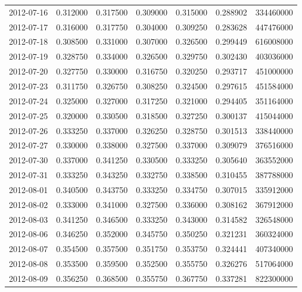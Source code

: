 \begin{tabular}{lrrrrrr}
2012-07-16 &    0.312000 &    0.317500 &    0.309000 &    0.315000 &    0.288902 &   334460000 \\
2012-07-17 &    0.316000 &    0.317750 &    0.304000 &    0.309250 &    0.283628 &   447476000 \\
2012-07-18 &    0.308500 &    0.331000 &    0.307000 &    0.326500 &    0.299449 &   616008000 \\
2012-07-19 &    0.328750 &    0.334000 &    0.326500 &    0.329750 &    0.302430 &   403036000 \\
2012-07-20 &    0.327750 &    0.330000 &    0.316750 &    0.320250 &    0.293717 &   451000000 \\
2012-07-23 &    0.311750 &    0.326750 &    0.308250 &    0.324500 &    0.297615 &   451584000 \\
2012-07-24 &    0.325000 &    0.327000 &    0.317250 &    0.321000 &    0.294405 &   351164000 \\
2012-07-25 &    0.320000 &    0.330500 &    0.318500 &    0.327250 &    0.300137 &   415044000 \\
2012-07-26 &    0.333250 &    0.337000 &    0.326250 &    0.328750 &    0.301513 &   338440000 \\
2012-07-27 &    0.330000 &    0.338000 &    0.327500 &    0.337000 &    0.309079 &   376516000 \\
2012-07-30 &    0.337000 &    0.341250 &    0.330500 &    0.333250 &    0.305640 &   363552000 \\
2012-07-31 &    0.333250 &    0.343250 &    0.332750 &    0.338500 &    0.310455 &   387788000 \\
2012-08-01 &    0.340500 &    0.343750 &    0.333250 &    0.334750 &    0.307015 &   335912000 \\
2012-08-02 &    0.333000 &    0.341000 &    0.327500 &    0.336000 &    0.308162 &   367912000 \\
2012-08-03 &    0.341250 &    0.346500 &    0.333250 &    0.343000 &    0.314582 &   326548000 \\
2012-08-06 &    0.346250 &    0.352000 &    0.345750 &    0.350250 &    0.321231 &   360324000 \\
2012-08-07 &    0.354500 &    0.357500 &    0.351750 &    0.353750 &    0.324441 &   407340000 \\
2012-08-08 &    0.353500 &    0.359500 &    0.352500 &    0.355750 &    0.326276 &   517064000 \\
2012-08-09 &    0.356250 &    0.368500 &    0.355750 &    0.367750 &    0.337281 &   822300000 \\

\end{tabular}

